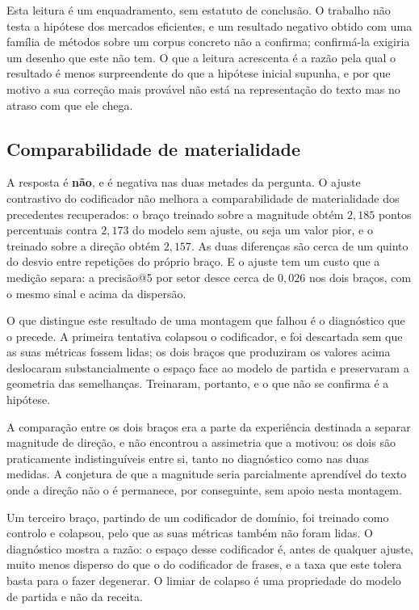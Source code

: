 Esta leitura é um enquadramento, sem estatuto de conclusão. O trabalho não testa a hipótese dos mercados
eficientes, e um resultado negativo obtido com uma família de métodos sobre um corpus concreto não
a confirma; confirmá-la exigiria um desenho que este não tem. O que a leitura acrescenta é a razão
pela qual o resultado é menos surpreendente do que a hipótese inicial supunha, e por que motivo a
sua correção mais provável não está na representação do texto mas no atraso com que ele chega.

\subsection{Comparabilidade de materialidade}
\label{sec:con_qi4}

A resposta é \textbf{não}, e é negativa nas duas metades da pergunta. O ajuste contrastivo do
codificador não melhora a comparabilidade de materialidade dos precedentes recuperados: o braço
treinado sobre a magnitude obtém $2{,}185$ pontos percentuais contra $2{,}173$ do modelo sem
ajuste, ou seja um valor pior, e o treinado sobre a direção obtém $2{,}157$. As duas diferenças
são cerca de um quinto do desvio entre repetições do próprio braço. E o ajuste tem um custo que a
medição separa: a precisão@5 por setor desce cerca de $0{,}026$ nos dois braços, com o mesmo
sinal e acima da dispersão.

O que distingue este resultado de uma montagem que falhou é o diagnóstico que o precede. A
primeira tentativa colapsou o codificador, e foi descartada sem que as suas métricas fossem
lidas; os dois braços que produziram os valores acima deslocaram substancialmente o espaço face
ao modelo de partida e preservaram a geometria das semelhanças. Treinaram, portanto, e o que não
se confirma é a hipótese.

A comparação entre os dois braços era a parte da experiência destinada a separar magnitude de
direção, e não encontrou a assimetria que a motivou: os dois são praticamente indistinguíveis
entre si, tanto no diagnóstico como nas duas medidas. A conjetura de que a magnitude seria
parcialmente aprendível do texto onde a direção não o é permanece, por conseguinte, sem apoio
nesta montagem.

Um terceiro braço, partindo de um codificador de domínio, foi treinado como controlo e
colapsou, pelo que as suas métricas também não foram lidas. O diagnóstico mostra a razão: o
espaço desse codificador é, antes de qualquer ajuste, muito menos disperso do que o do
codificador de frases, e a taxa que este tolera basta para o fazer degenerar. O limiar de
colapso é uma propriedade do modelo de partida e não da receita.

